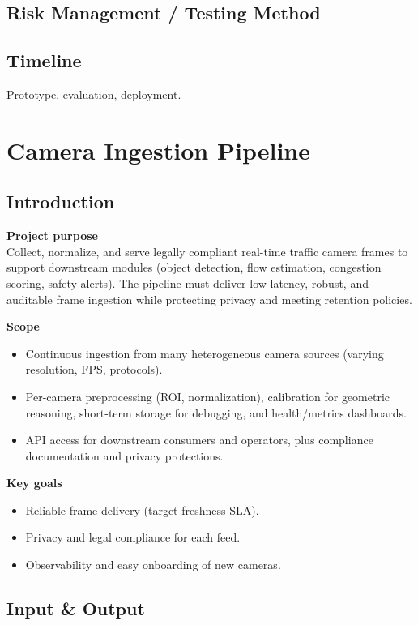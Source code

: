 \subsection{Risk Management / Testing Method}


\subsection{Timeline}
Prototype, evaluation, deployment.



\section{Camera Ingestion Pipeline}
\label{sec:camera-ingestion}
\subsection{Introduction}
			\textbf{Project purpose}\\
Collect, normalize, and serve legally compliant real-time traffic camera frames to support downstream modules (object detection, flow estimation, congestion scoring, safety alerts). The pipeline must deliver low-latency, robust, and auditable frame ingestion while protecting privacy and meeting retention policies.

\vspace{0.5em}
			\textbf{Scope}
\begin{itemize}
  \item Continuous ingestion from many heterogeneous camera sources (varying resolution, FPS, protocols).
  \item Per-camera preprocessing (ROI, normalization), calibration for geometric reasoning, short-term storage for debugging, and health/metrics dashboards.
  \item API access for downstream consumers and operators, plus compliance documentation and privacy protections.
\end{itemize}

		    \textbf{Key goals}
\begin{itemize}
  \item Reliable frame delivery (target freshness SLA).
  \item Privacy and legal compliance for each feed.
  \item Observability and easy onboarding of new cameras.
\end{itemize}

\subsection{Input \& Output}
